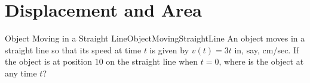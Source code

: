 \section{Displacement and Area}\label{sec:AreaProb}






\begin{example}{Object Moving in a Straight Line}{ObjectMovingStraightLine}
An object moves in a straight line so that
its speed at time $t$ is given by $v(t)=3t$ in, say, cm/sec. If the
object is at position $10$ on the straight line when $t=0$, where is
the object at any time $t$? 
\end{example}







